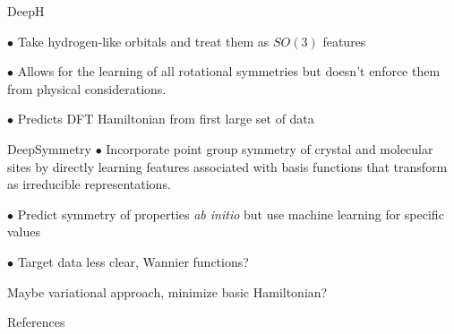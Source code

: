 \documentclass[11pt]{beamer}
\begin{document}
\begin{frame}{DeepH}
	
	
$\bullet$ Take hydrogen-like orbitals and treat them as $SO(3)$ features 

\medskip

$\bullet$ Allows for the learning of all rotational symmetries but doesn't enforce them from physical considerations.


\medskip 

$\bullet$ Predicts DFT Hamiltonian from first large set of data

\end{frame}



\begin{frame}{DeepSymmetry}
$\bullet$ Incorporate point group symmetry of crystal and molecular sites by directly learning features associated with basis functions that transform as irreducible representations.

\medskip

$\bullet$ Predict symmetry of properties \textit{ab initio} but use machine learning for specific values

\medskip

$\bullet$ Target data less clear, Wannier functions?

\vspace{0.5cm}

Maybe variational approach, minimize basic Hamiltonian?

\end{frame}


\begin{frame}{References}

	\printbibliography
\end{frame}
\end{document}
